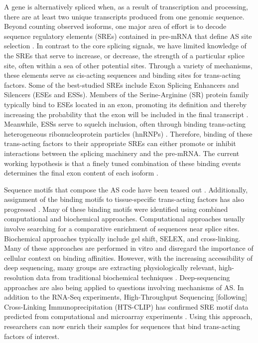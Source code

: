 A gene is alternatively spliced when, as a result of transcription and processing, there are at least two unique transcripts produced from one genomic sequence. Beyond counting observed isoforms, one major area of effort is to decode sequence regulatory elements (SREs) contained in pre-mRNA that define AS site selection \citep{Wang2008}. In contrast to the core splicing signals, we have limited knowledge of the SREs that serve to increase, or decrease, the strength of a particular splice site, often within a sea of other potential sites. Through a variety of mechanisms, these elements serve as cis-acting sequences and binding sites for trans-acting factors. Some of the best-studied SREs include Exon Splicing Enhancers and Silencers (ESEs and ESSs). Members of the Serine-Arginine (SR) protein family typically bind to ESEs located in an exon, promoting its definition and thereby increasing the probability that the exon will be included in the final transcript \citep{Graveley2000,Long2009}. Meanwhile, ESSs serve to squelch inclusion, often through binding trans-acting heterogeneous ribonucleoprotein particles (hnRNPs) \citep{Martinez-Contreras2007}. Therefore, binding of these trans-acting factors to their appropriate SREs can either promote or inhibit interactions between the splicing machinery and the pre-mRNA. The current working hypothesis is that a finely tuned combination of these binding events determines the final exon content of each isoform \citep{House2008}. 

Sequence motifs that compose the AS code have been teased out \citep{Ladd2002, Barash2010}. Additionally, assignment of the binding motifs to tissue-specific trans-acting factors has also progressed \citep{Jin2003,Ule2005,Licatalosi2008}. Many of these binding motifs were identified using combined computational and biochemical approaches. Computational approaches usually involve searching for a comparative enrichment of sequences near splice sites. Biochemical approaches typically include gel shift, SELEX, and cross-linking. Many of these approaches are performed in vitro and disregard the importance of cellular context on binding affinities. However, with the increasing accessibility of deep sequencing, many groups are extracting physiologically relevant, high-resolution data from traditional biochemical techniques \citep{Ingolia2009, Ingolia2011}. Deep-sequencing approaches are also being applied to questions involving mechanisms of AS. In addition to the RNA-Seq experiments, High-Throughput Sequencing [following] Cross-Linking Immunoprecipitation (HTS-CLIP) has confirmed SRE motif data predicted from computational and microarray experiments \citep{Licatalosi2008,Hafner2010}. Using this approach, researchers can now enrich their samples for sequences that bind trans-acting factors of interest. 


